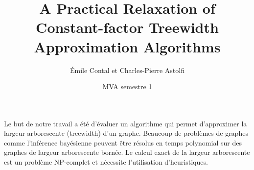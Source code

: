 \documentclass[handout]{beamer}
\title{\VeryHuge A Practical Relaxation of Constant-factor Treewidth
        Approximation Algorithms}
\author{\huge Émile Contal et Charles-Pierre Astolfi}
\date{MVA semestre 1}
\begin{document}
\begin{frame}
  \maketitle
  \begin{block}
    \centering
    \huge Le but de notre travail a été d'évaluer un algorithme qui permet
    d'approximer la largeur arborescente (treewidth) d'un graphe.
    Beaucoup de problèmes de graphes comme l'inférence bayésienne peuvent
    être résolus en temps polynomial sur des graphes de largeur
    arborescente bornée. 
    \cite{bayesian_inferance} %
    Le calcul exact de la largeur arborescente est un
    problème NP-complet et nécessite l'utilisation d'heuristiques.
  \end{block}
\end{frame}
\end{document}
